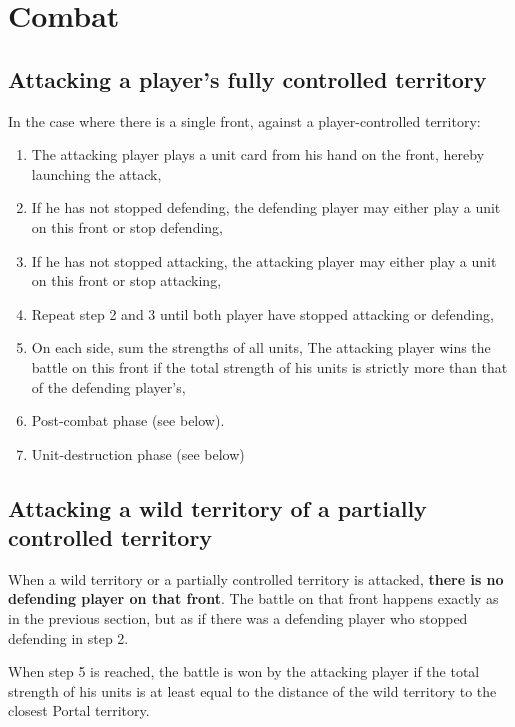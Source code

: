 \documentclass[a4paper]{article}
\begin{document}
\newpage
\section{Combat}

  \subsection{Attacking a player's fully controlled territory}
  
    \hspace{-2em} In the case where there is a single front,
    against a player-controlled territory:
    \vspace{-1.3em}
    \begin{enumerate}
        \item The attacking player plays a unit card from his hand on the front,
        hereby launching the attack,
        \item If he has not stopped defending,
        the defending player may either play a unit on this front or stop defending,
        \item If he has not stopped attacking,
        the attacking player may either play a unit on this front or stop attacking,
        \item Repeat step 2 and 3 until both player have stopped attacking or defending,
        \item On each side, sum the strengths of all units,
        The attacking player wins the battle on this front if the total strength
        of his units is strictly more than that of the defending player's,
        \item Post-combat phase (see below).
        \item Unit-destruction phase (see below)
    \end{enumerate}
    

  \subsection{Attacking a wild territory of a partially controlled territory}
    
    When a wild territory or a partially controlled territory is attacked,
    \textbf{there is no defending player on that front}.
    The battle on that front happens exactly as in the previous section,
    but as if there was a defending player who stopped defending in step 2.
    
    When step 5 is reached, the battle is won by the attacking player if the total
    strength of his units is at least equal to the distance of the wild territory
    to the closest Portal territory.
    
\end{document}
